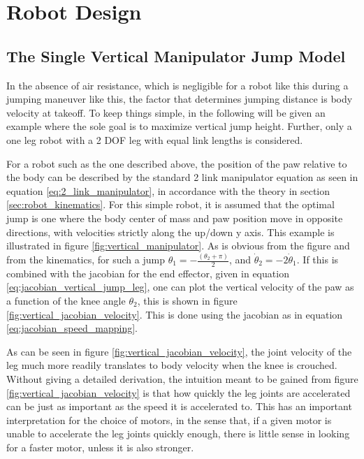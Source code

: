 \section{Robot Design}
\label{sec:robot_design}

\subsection{The Single Vertical Manipulator Jump Model}

In the absence of air resistance, which is negligible for a robot like this during a jumping maneuver like this, the factor that determines jumping distance is body velocity at takeoff. To keep things simple, in the following will be given an example where the sole goal is to maximize vertical jump height. Further, only a one leg robot with a 2 DOF leg with equal link lengths is considered. 

For a robot such as the one described above, the position of the paw relative to the body can be described by the standard 2 link manipulator equation as seen in equation \ref{eq:2_link_manipulator}, in accordance with the theory in section \ref{sec:robot_kinematics}. For this simple robot, it is assumed that the optimal jump is one where the body center of mass and paw position move in opposite directions, with velocities strictly along the up/down y axis. This example is illustrated in figure \ref{fig:vertical_manipulator}. As is obvious from the figure and from the kinematics, for such a jump $\theta_1 = -\frac{(\theta_2+\pi)}{2}$, and $\dot{\theta}_2=-2\dot{\theta}_1$. If this is combined with the jacobian for the end effector, given in equation \ref{eq:jacobian_vertical_jump_leg}, one can plot the vertical velocity of the paw as a function of the knee angle $\theta_2$, this is shown in figure \ref{fig:vertical_jacobian_velocity}. This is done using the jacobian as in equation \ref{eq:jacobian_speed_mapping}. 

As can be seen in figure \ref{fig:vertical_jacobian_velocity}, the joint velocity of the leg much more readily translates to body velocity when the knee is crouched. Without giving a detailed derivation, the intuition meant to be gained from figure \ref{fig:vertical_jacobian_velocity} is that how quickly the leg joints are accelerated can be just as important as the speed it is accelerated to. This has an important interpretation for the choice of motors, in the sense that, if a given motor is unable to accelerate the leg joints quickly enough, there is little sense in looking for a faster motor, unless it is also stronger. 

